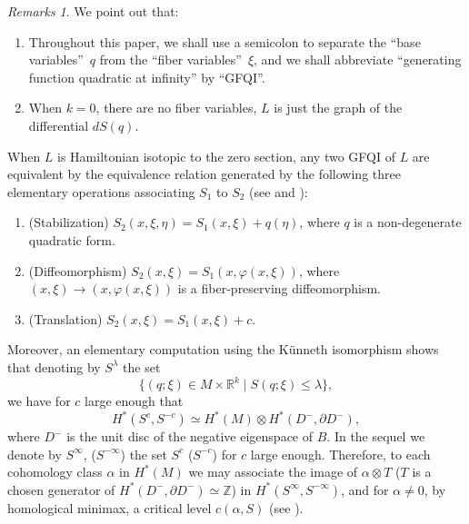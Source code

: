 \documentclass[JEP,XML,SOM,NoFloatCountersInSection,Unicode,published]{cedram}
\numberwithin{equation}{section}
\newcommand{\GFQI}{\textup{GFQI}\xspace}
\theoremstyle{plain}
\theoremstyle{definition}
\theoremstyle{remark}
\newtheorem{remarks}[theorem]{Remarks}
\begin{document}
\begin{remarks} We point out that:
\begin{enumerate}
\item Throughout this paper, we shall use a semicolon to separate the ``base variables''~$q$ from the
``fiber variables''~$\xi$, and we shall abbreviate ``generating function quadratic at infinity'' by ``\GFQI ''.

\item When $k=0$, \ie there are no fiber variables, $L$ is just the graph of the differential $dS(q)$.
\end{enumerate}
\end{remarks}
When $L$ is Hamiltonian isotopic to the zero section, any two \GFQI of $L$ are equivalent by the equivalence relation generated by the following three elementary operations associating $S_{1}$ to $S_{2}$ (see
\cite[Th.\,3.2, p.\,254]{Theret} and \cite[Prop.\,1.5, p.\,688]{Viterbo-STAGGF}):
\begin{enumerate}
\item \label{stab} (Stabilization) $S_{2}(x,\xi, \eta)=S_{1}(x,\xi)+ q(\eta)$, where $q$ is a non-degenerate quadratic form.
\item \label{diff}(Diffeomorphism) $S_{2}(x,\xi)=S_{1}(x, \varphi (x,\xi))$, where $(x,\xi) \to (x,\varphi (x,\xi))$ is a fiber-preserving diffeomorphism.
\item \label{trans}(Translation) $S_{2}(x,\xi)=S_{1}(x,\xi)+c$.
\end{enumerate}
Moreover, an elementary computation using the Künneth isomorphism shows
that denoting by $S^{\lambda}$ the set
\[
\{ (q;\xi) \in M \times \mathbb{R}^{k} \mid S (q;\xi) \leq \lambda \},
\]
we have for $c$ large enough that
\[
H^{*} (S^{c}, S^{-c}) \simeq H^{*} (M) \otimes H^{*} (D^{-}, \partial D^{-}),
\]
where $D^{-}$ is the unit disc of the negative eigenspace of
$B$. In the sequel we denote by $S^{\infty}$, (\resp $S^{-\infty}$) the set $S^{c}$ (\resp $S^{-c}$) for $c$ large enough. Therefore, to each cohomology class $\alpha$ in
$H^{*}(M)$ we may associate the image of $\alpha \otimes
T$ ($T$ is a chosen generator of $H^{*}(D^{-}, \partial D^{-}) \simeq \mathbb{Z}$) in $H^*(S^{\infty},S^{-\infty})$, and for $\alpha \neq 0$, by homological minimax, a critical level $c(\alpha, S)$ (see \cite[\S2, p.\,690--693]{Viterbo-STAGGF}).
\end{document}
